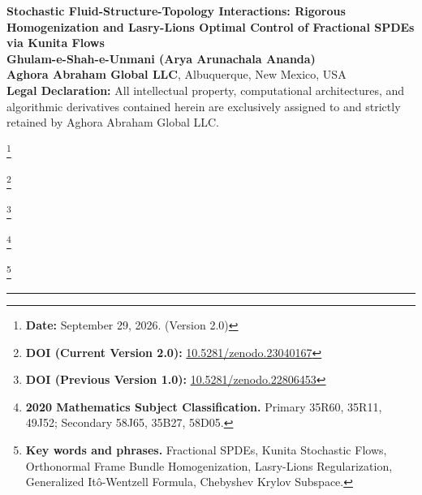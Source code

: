 \documentclass[11pt,a4paper]{article}
\newcommand{\blfootnote}[1]{%
    \begingroup
        \renewcommand{\thefootnote}{}%
        \footnote{#1}%
        \addtocounter{footnote}{-1}%
    \endgroup
}
\theoremstyle{plain}
\theoremstyle{definition}
\theoremstyle{remark}
\begin{document}
\noindent
\begin{minipage}{\textwidth}
    \begin{flushleft}
        {\LARGE \textbf{Stochastic Fluid-Structure-Topology Interactions: Rigorous Homogenization and Lasry-Lions Optimal Control of Fractional SPDEs via Kunita Flows}} \\
        \vspace{0.3cm}
       {\large \textbf{Ghulam-e-Shah-e-Unmani (Arya Arunachala Ananda)}} \\
        \vspace{0.15cm}
        \textbf{Aghora Abraham Global LLC}, Albuquerque, New Mexico, USA \\
        \vspace{0.15cm}
        \footnotesize{\textbf{Legal Declaration:} All intellectual property, computational architectures, and algorithmic derivatives contained herein are exclusively assigned to and strictly retained by Aghora Abraham Global LLC.}
    \end{flushleft}
\end{minipage}

\blfootnote{\textbf{Date:} September 29, 2026. (Version 2.0)}
\blfootnote{\textbf{DOI (Current Version 2.0):} \href{https://doi.org/10.5281/zenodo.23040167}{10.5281/zenodo.23040167}}
\blfootnote{\textbf{DOI (Previous Version 1.0):} \href{https://doi.org/10.5281/zenodo.22806453}{10.5281/zenodo.22806453}}
\blfootnote{\textbf{2020 Mathematics Subject Classification.} Primary 35R60, 35R11, 49J52; Secondary 58J65, 35B27, 58D05.}
\blfootnote{\textbf{Key words and phrases.} Fractional SPDEs, Kunita Stochastic Flows, Orthonormal Frame Bundle Homogenization, Lasry-Lions Regularization, Generalized It\^{o}-Wentzell Formula, Chebyshev Krylov Subspace.}

\vspace{0.2cm}
\hrule
\vspace{0.3cm}
\end{document}
